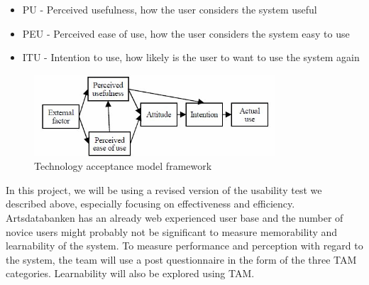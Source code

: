 \begin{itemize}
\item PU - Perceived usefulness, how the user considers the system useful

\item PEU - Perceived ease of use, how the user considers the system easy to use
\item ITU - Intention to use, how likely is the user to want to use the system again
\end{itemize}

\begin{figure}[htb]
	\centering
	\includegraphics[width=0.8\textwidth]{reqspec/tam.png}
	\caption{Technology acceptance model framework\cite{tam:doc4}}
	\label{fig:tam}
\end{figure}

In this project, we will be using a revised version of the usability test we described above, especially focusing on effectiveness and efficiency. Artsdatabanken has an already web experienced user base and the number of novice users might probably not be significant to measure memorability and learnability of the system.
To measure performance and perception with regard to the system, the team will use a post questionnaire in the form of the three TAM categories. Learnability will also be explored using TAM.

\newpage
